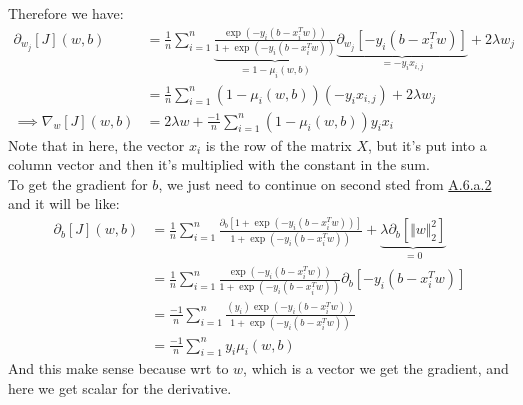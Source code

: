 \documentclass[]{article}
\begin{document}
        Therefore we have: 
        \begin{align*}\tag{A.6.a.4}\label{eqn:A.6.a.4}
            \partial_{w_j}[J](w, b)
            &= 
            \frac{1}{n}\sum_{i  = 1}^{n}
                \underbrace{\frac{
                    \exp(-y_i(b - x_i^T w))
                }
                {
                    1 + \exp(-y_i(b - x_i^T w))
                }}_{= 1- \mu_i(w, b)}\underbrace{\partial_{w_j}[-y_i(b - x_i^Tw)]}_{= -y_ix_{i,j}}
                + 2\lambda w_j
            \\
            &= 
            \frac{1}{n}\sum_{i  = 1}^{n}
                (1- \mu_i(w, b))(-y_i x_{i, j})
                + 2\lambda w_j
            \\
            \implies \nabla_w[J](w, b) &= 2\lambda w + \frac{-1}{n}\sum_{i = 1}^{n}
                (1 - \mu_i(w, b))y_ix_i
        \end{align*}
        Note that in here, the vector $x_i$ is the row of the matrix $X$, but it's put into a column vector and then it's multiplied with the constant in the sum. 
        \\
        To get the gradient for $b$, we just need to continue on second sted from \hyperref[eqn:A.6.a.2]{A.6.a.2} and it will be like: 
        \begin{align*}\tag{A.6.a.5}\label{eqn:A.6.a.5}
            \partial_{b}[J](w, b)
            &= 
            \frac{1}{n}\sum_{i  = 1}^{n}
                \frac{
                    \partial_{b}[1 + \exp(-y_i(b - x_i^T w))]
                }
                {
                    1 + \exp(-y_i(b - x_i^T w))
                }
                +
                \underbrace{\lambda\partial_{b}[\Vert w\Vert_2^2]}_{ = 0}
            \\
            &= 
            \frac{1}{n}\sum_{i  = 1}^{n}
                \frac{
                    \exp(-y_i(b - x_i^T w))
                }
                {
                    1 + \exp(-y_i(b - x_i^T w))
                }
                \partial_{b}[-y_i(b - x_i^Tw)]
            \\
            &=
            \frac{-1}{n}\sum_{i  = 1}^{n}
                \frac{
                    (y_i)\exp(-y_i(b - x_i^T w))
                }
                {
                    1 + \exp(-y_i(b - x_i^T w))
                }
            \\
            &=
            \frac{-1}{n}\sum_{i  = 1}^{n}
                y_i\mu_i(w, b)
        \end{align*}
        And this make sense because wrt to $w$, which is a vector we get the gradient, and here we get scalar for the derivative. 
\end{document}
